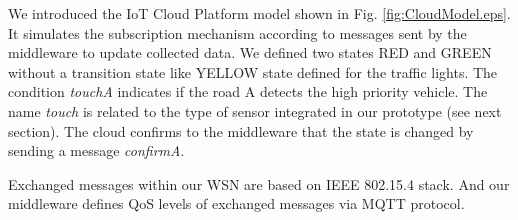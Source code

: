 \documentclass[conference]{../../setup/IEEEtran}
\begin{document}
We introduced the IoT Cloud Platform model shown in Fig. \ref{fig:CloudModel.eps}. It simulates the subscription mechanism according to messages sent by the middleware to update collected data. We defined two states RED and GREEN without a transition state like YELLOW state defined for the traffic lights. The condition \emph{touchA} indicates if the road A detects the high priority vehicle. The name \emph{touch} is related to the type of sensor integrated in our prototype (see next section). The cloud confirms to the middleware that the state is changed by sending a message \emph{confirmA}. 

Exchanged messages within our WSN are based on IEEE 802.15.4 stack. And our middleware defines QoS levels of exchanged messages via MQTT protocol.  






\end{document}
